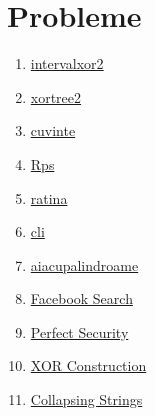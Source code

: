 \section{Probleme}

\begin{enumerate}
    \item \href{https://kilonova.ro/problems/456}{intervalxor2}
    \item \href{https://kilonova.ro/problems/361}{xortree2}
    \item \href{https://kilonova.ro/problems/65}{cuvinte}
    \item \href{https://kilonova.ro/problems/371}{Rps}
    \item \href{https://www.infoarena.ro/problema/ratina}{ratina}
    \item \href{https://www.infoarena.ro/problema/cli}{cli}
    \item \href{https://www.infoarena.ro/problema/aiacupalindroame}{aiacupalindroame}
    \item \href{https://www.infoarena.ro/problema/fbsearch}{Facebook Search}
    \item \href{https://codeforces.com/contest/948/problem/D}{Perfect Security}
    \item \href{https://codeforces.com/contest/1895/problem/D}{XOR Construction}
    \item \href{https://codeforces.com/contest/1902/problem/E}{Collapsing Strings}
\end{enumerate}
